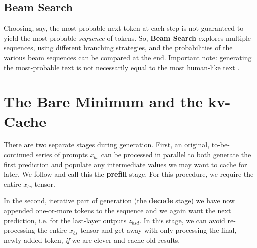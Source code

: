 \documentclass[11pt]{article}
\begin{document}
\subsection{Beam Search \label{subsec_beam_search}}

Choosing, say, the most-probable next-token at each step is not guaranteed to yield the most
probable \textit{sequence} of tokens. So, \textbf{Beam Search} explores multiple sequences, using
different branching strategies, and the probabilities of the various beam sequences can be compared
at the end. Important note: generating the most-probable text is not necessarily equal to the most
human-like text \cite{holtzman2020curious}.





\section{The Bare Minimum and the kv-Cache \label{sec_kv_cache}}


There are two separate stages during generation. First, an original, to-be-continued series of prompts
$ x _{ bs }  $ can be processed in parallel to both generate the first prediction and populate any
intermediate values we may want to cache for later. We follow \cite{pope2022efficiently} and call this the
\textbf{prefill} stage. For this procedure, we require the entire $ x _{ bs } $ tensor.

In the second, iterative part of generation (the \textbf{decode} stage) we have now appended
one-or-more tokens to the sequence and we again want the next prediction, i.e. 
for the last-layer outputs $ z _{ bsd } $. In this stage, we can avoid re-processing the entire $ x
_{ bs } $ tensor and get away with only processing the final, newly added token, \textit{if} we are
clever and cache old results.
\end{document}
